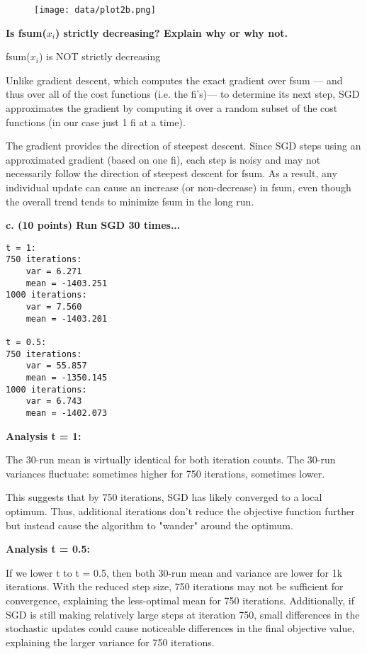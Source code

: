 \documentclass[a4paper,10pt]{article}
\theoremstyle{definition}
\begin{document}
\begin{figure}[h]
  \centering
  \texttt{[image: data/plot2b.png]}
  \label{fig:plot2b}
\end{figure}
\textbf{Is fsum($x_i$) strictly decreasing? Explain why or why not.}

fsum($x_i$) is NOT strictly decreasing

Unlike gradient descent, which computes the exact gradient over fsum
–– and thus over all of the cost functions (i.e. the fi's)–– to determine its next step, 
SGD approximates the gradient by computing it over a random subset
of the cost functions (in our case just 1 fi at a time).

The gradient provides the direction of steepest descent. Since SGD steps using 
an approximated gradient (based on one fi), each step is noisy and may not 
necessarily follow the direction of steepest descent for fsum. As a result, any 
individual update can cause an increase (or non-decrease) in fsum, even though 
the overall trend tends to minimize fsum in the long run.

\textbf{c. (10 points) Run SGD 30 times...}
\begin{verbatim}
t = 1:
750 iterations:
    var = 6.271
    mean = -1403.251
1000 iterations:
    var = 7.560
    mean = -1403.201

t = 0.5:
750 iterations:
    var = 55.857
    mean = -1350.145
1000 iterations:
    var = 6.743
    mean = -1402.073
\end{verbatim}

\textbf{Analysis t = 1:}

The 30-run mean is virtually identical for both iteration counts. The 30-run variances fluctuate: sometimes higher for 750 iterations, sometimes lower.

This suggests that by 750 iterations, SGD has likely converged to a local optimum.
Thus, additional iterations don't reduce the objective function further but instead cause the
algorithm to "wander" around the optimum.

\textbf{Analysis t = 0.5:}

If we lower t to t = 0.5, then both 30-run mean and variance are lower for
1k iterations. With the reduced step size, 750 iterations may not be sufficient for convergence,
explaining the less-optimal mean for 750 iterations. Additionally, if SGD is
still making relatively large steps at iteration 750, small differences in the stochastic
updates could cause noticeable differences in the final objective value, explaining
the larger variance for 750 iterations.
\end{document}
